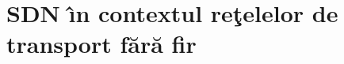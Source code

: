 \chapter{SDN \^{\i}n contextul reţelelor de transport fără fir\label{ch:sdn_in_contextul_wt}}






